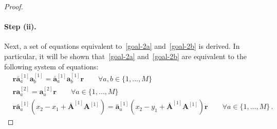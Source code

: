 \documentclass[10pt,a4paper]{amsart}
\newcommand{\M}{M}
\newcommand{\OA}{\mathbf{A}}
\newcommand{\OAD}{\mathbf{\bar{A}}}
\newcommand{\oad}{\mathbf{\bar{a}}}
\begin{document}
\begin{proof}
\paragraph{Step (ii).} Next, a set of equations equivalent to~\eqref{goal-2a} and~\eqref{goal-2b} is derived. In particular, it  will be shown that~\eqref{goal-2a} and~\eqref{goal-2b} are equivalent to the following system of equations:
\begin{align}
				&\mathbf{r}{\oad}_{a}^{[1]}\mathbf{a}_{b}^{[1]}={\oad}_{a}^{[1]}\mathbf{a}_{b}^{[1]}\mathbf{r}\qquad \forall a,b \in \{1,\ldots,\M\}
    \label{set1} \\
		&\mathbf{r}\mathbf{a}_{a}^{[2]}=\mathbf{a}_{a}^{[2]}\mathbf{r}\qquad \forall a \in \{1,\ldots,\M\}
    \label{set2} \\
		&\mathbf{r}{\oad}_{a}^{[1]}(x_{2}-x_{1}+\OAD^{[1]}\OA^{[1]})={\oad}_{a}^{[1]}(x_{2}-y_{1}+\OAD^{[1]}\OA^{[1]})\mathbf{r}\qquad \forall a\in \{1,\ldots,\M\}\,.
    \label{set3}
        \end{align}


\end{proof}
\end{document}
